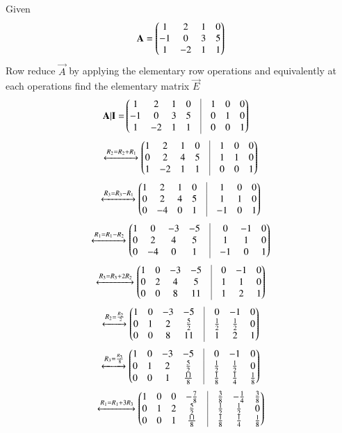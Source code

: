 Given 
\begin{align}
\mathbf{A}=\begin{pmatrix}1&2&1&0\\-1&0&3&5\\1&-2&1&1\end{pmatrix}
\end{align}
Row reduce $\vec{A}$ by applying the elementary row operations and equivalently at each operations find the elementary matrix $\vec{E}$
\begin{align}
    \vec{A|I}=&\myvec{1&2&1&0&\vrule&1&0&0\\-1&0&3&5&\vrule&0&1&0\\1&-2&1&1&\vrule&0&0&1}
\end{align}
\begin{align}
    \xleftrightarrow{R_2=R_2+R_1}\myvec{1&2&1&0&\vrule&1&0&0\\0&2&4&5&\vrule&1&1&0\\1&-2&1&1&\vrule&0&0&1}
\end{align}
\begin{align}
\xleftrightarrow{R_3=R_3-R_1}\myvec{1&2&1&0&\vrule&1&0&0\\0&2&4&5&\vrule&1&1&0\\0&-4&0&1&\vrule&-1&0&1}
\end{align}
\begin{align}
\xleftrightarrow{R_1=R_1-R_2}\myvec{1&0&-3&-5&\vrule&0&-1&0\\0&2&4&5&\vrule&1&1&0\\0&-4&0&1&\vrule&-1&0&1}
\end{align}
\begin{align}
\xleftrightarrow{R_3=R_3+2R_2}\myvec{1&0&-3&-5&\vrule&0&-1&0\\0&2&4&5&\vrule&1&1&0\\0&0&8&11&\vrule&1&2&1}
\end{align}
\begin{align}
\xleftrightarrow{R_2=\frac{R_2}{2}}\myvec{1&0&-3&-5&\vrule&0&-1&0\\0&1&2&\frac{5}{2}&\vrule&\frac{1}{2}&\frac{1}{2}&0\\0&0&8&11&\vrule&1&2&1}
\end{align}
\begin{align}
\xleftrightarrow{R_3=\frac{R_3}{8}}\myvec{1&0&-3&-5&\vrule&0&-1&0\\0&1&2&\frac{5}{2}&\vrule&\frac{1}{2}&\frac{1}{2}&0\\0&0&1&\frac{11}{8}&\vrule&\frac{1}{8}&\frac{1}{4}&\frac{1}{8}}
\end{align}
\begin{align}
\xleftrightarrow{R_1=R_1+3R_3}\myvec{1&0&0&-\frac{7}{8}&\vrule&\frac{3}{8}&-\frac{1}{4}&\frac{3}{8}\\0&1&2&\frac{5}{2}&\vrule&\frac{1}{2}&\frac{1}{2}&0\\0&0&1&\frac{11}{8}&\vrule&\frac{1}{8}&\frac{1}{4}&\frac{1}{8}}
\end{align}
